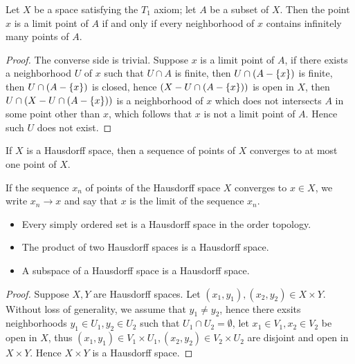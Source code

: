 \documentclass[12pt,a4paper]{article}
\begin{document}
    \begin{thm}\label{2.6.18}
        Let $X$ be a space satisfying the $T_1$ axiom; let $A$ be a subset of $X$. Then the point $x$ is a limit point of $A$ if and only if every neighborhood of $x$ contains infinitely many points of $A$.
    \end{thm}
    \begin{proof}
        The converse side is trivial. Suppose $x$ is a limit point of $A$, if there exists a neighborhood $U$ of $x$ such that $U\cap A$ is finite, then $U\cap (A-\left\{x\right\})$ is finite, then $U\cap (A-\left\{x\right\})$ is closed, hence $(X-U\cap (A-\left\{x\right\}))$ is open in $X$, then $U\cap(X-U\cap (A-\left\{x\right\}))$ is a neighborhood of $x$ which does not intersects $A$ in some point other than $x$, which follows that $x$ is not a limit point of $A$. Hence such $U$ does not exist.
    \end{proof}
    \hfill

    \begin{thm}
        If $X$ is a Hausdorff space, then a sequence of points of $X$ converges to at most one point of $X$.
    \end{thm}
    \begin{remark}
        If the sequence $x_n$ of points of the Hausdorff space $X$ converges to $x\in X$, we write $x_n\to x$ and say that $x$ is the limit of the sequence $x_n$.
    \end{remark}
    \hfill

    \begin{thm}\hfill

        \begin{itemize}
            \item Every simply ordered set is a Hausdorff space in the order topology.
            \item The product of two Hausdorff spaces is a Hausdorff space.
            \item A subspace of a Hausdorff space is a Hausdorff space. 
        \end{itemize}
    \end{thm}
    \begin{proof}
        Suppose $X,Y$ are Hausdorff spaces. Let $(x_1,y_1),(x_2,y_2)\in X\times Y$. Without loss of generality, we assume that $y_1\neq y_2$, hence there exsits neighborhoods $y_1\in U_1,y_2\in U_2$ such that $U_1\cap U_2=\emptyset$, let $x_1\in V_1,x_2\in V_2$ be open in $X$, thus $(x_1,y_1)\in V_1\times U_1,(x_2,y_2)\in V_2\times U_2$ are disjoint and open in $X\times Y$. Hence $X\times Y$ is a Hausdorff space. 
    \end{proof}
    \hfill
\end{document}
